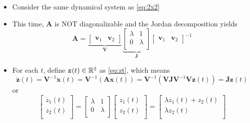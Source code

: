 \documentclass[12pt,a4paper]{article}
\begin{document}
\begin{itemize}
  \begin{itemize}
  \item Consider the same dynamical system as \eqref{eq:2x2}
  \item This time, 
    $\bm{A}$ is NOT diagonalizable
    and the Jordan decomposition yields
    \begin{equation}\nonumber%
      \bm{A} =
      \underbrace{
      \begin{bmatrix}
        \bm{v}_{1} & \bm{v}_{2}
      \end{bmatrix}}_{\bm{V}}
    \underbrace{
      \begin{bmatrix}
        \lambda & 1 \\
        0 & \lambda \\
      \end{bmatrix}}_{\bm{J}}
      \begin{bmatrix}
        \bm{v}_{1} & \bm{v}_{2}
      \end{bmatrix}^{-1}
    \end{equation}
  \item For each $t$, define $\bm{z}(t)\in\mathbb{R}^{2}$ as \eqref{eq:zt},
    which means
    \begin{equation}\nonumber%
      \dot{\bm{z}}(t)
      = \bm{V}^{-1}\dot{\bm{x}}(t)
      = \bm{V}^{-1}\left(\bm{A}\bm{x}(t)\right)
      = \bm{V}^{-1}\left(\bm{V}\bm{J}\bm{V}^{-1}\bm{V}\bm{z}(t)\right)
      = \bm{J}\bm{z}(t)
    \end{equation}
    or
    \begin{equation}\nonumber%
      \begin{bmatrix}
        \dot{z}_{1}(t)\\
        \dot{z}_{2}(t)\\
      \end{bmatrix}
      =
      \begin{bmatrix}
        \lambda & 1 \\
        0 & \lambda \\
      \end{bmatrix}
      \begin{bmatrix}
        z_{1}(t)\\
        z_{2}(t)\\
      \end{bmatrix}
      =
      \begin{bmatrix}
        \lambda z_{1}(t) + z_{2}(t)\\
        \lambda z_{2}(t)\\
      \end{bmatrix}

\end{equation}
\end{itemize}
\end{itemize}
\end{document}
